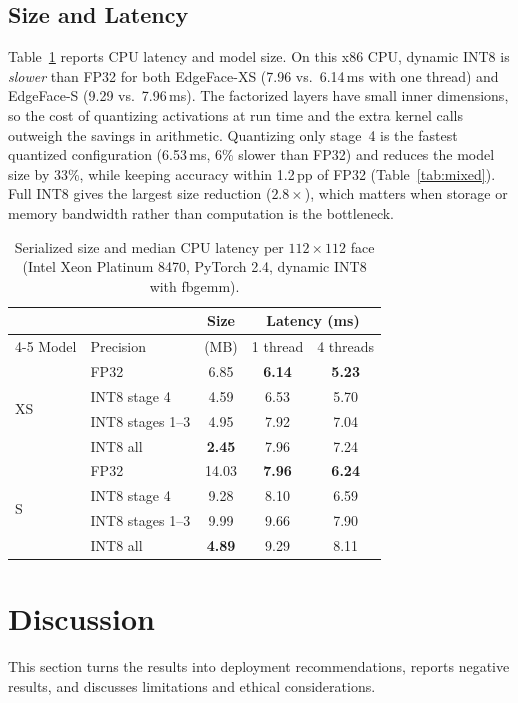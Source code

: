 \documentclass[journal]{IEEEtran}
\begin{document}
\subsection{Size and Latency}
\label{sec:cost}
Table~\ref{tab:latency} reports CPU latency and model size. On this x86 CPU, dynamic INT8 is \emph{slower} than FP32 for both EdgeFace-XS (7.96 vs.\ 6.14\,ms with one thread) and EdgeFace-S (9.29 vs.\ 7.96\,ms). The factorized layers have small inner dimensions, so the cost of quantizing activations at run time and the extra kernel calls outweigh the savings in arithmetic. Quantizing only stage~4 is the fastest quantized configuration (6.53\,ms, 6\% slower than FP32) and reduces the model size by 33\%, while keeping accuracy within 1.2\,pp of FP32 (Table~\ref{tab:mixed}). Full INT8 gives the largest size reduction ($2.8\times$), which matters when storage or memory bandwidth rather than computation is the bottleneck.

\begin{table}[t]
\centering
\caption{Serialized size and median CPU latency per $112\times112$ face (Intel Xeon Platinum 8470, PyTorch 2.4, dynamic INT8 with fbgemm).}
\label{tab:latency}
\setlength{\tabcolsep}{4pt}
\begin{tabular}{llccc}
\toprule
 & & Size & \multicolumn{2}{c}{Latency (ms)} \\
\cmidrule(lr){4-5}
Model & Precision & (MB) & 1 thread & 4 threads \\
\midrule
\multirow{4}{*}{XS} & FP32 & 6.85 & \textbf{6.14} & \textbf{5.23} \\
 & INT8 stage 4 & 4.59 & 6.53 & 5.70 \\
 & INT8 stages 1--3 & 4.95 & 7.92 & 7.04 \\
 & INT8 all & \textbf{2.45} & 7.96 & 7.24 \\
\midrule
\multirow{4}{*}{S} & FP32 & 14.03 & \textbf{7.96} & \textbf{6.24} \\
 & INT8 stage 4 & 9.28 & 8.10 & 6.59 \\
 & INT8 stages 1--3 & 9.99 & 9.66 & 7.90 \\
 & INT8 all & \textbf{4.89} & 9.29 & 8.11 \\
\bottomrule
\end{tabular}
\end{table}

\section{Discussion}
\label{sec:discussion}
This section turns the results into deployment recommendations, reports negative results, and discusses limitations and ethical considerations.
\end{document}

